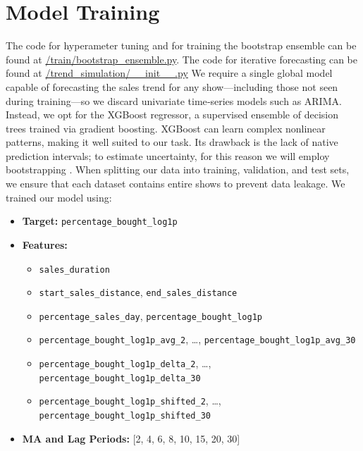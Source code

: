 \documentclass{Configuration_Files/PoliMi3i_thesis}
\begin{document}
\chapter{Model Training}
The code for hyperameter tuning and for training the bootstrap ensemble can be found at \href{https://github.com/SiniscalchiCarlo/piccolo_teatro/blob/develop/piccolo_teatro/train/bootstrap\_ensemble.py}{/train/bootstrap\_ensemble.py}.
The code for iterative forecasting can be found at \href{https://github.com/SiniscalchiCarlo/piccolo_teatro/blob/develop/piccolo_teatro/trend_simulation/__init__.py}{/trend\_simulation/\_\_init\_\_.py}
We require a single global model capable of forecasting the sales trend for any show—including those not seen during training—so we discard univariate time‐series models such as ARIMA.  Instead, we opt for the XGBoost regressor, a supervised ensemble of decision trees trained via gradient boosting.  XGBoost \cite{chen2016xgboost} can learn complex nonlinear patterns, making it well suited to our task.  Its drawback is the lack of native prediction intervals; to estimate uncertainty, for this reason we will employ bootstrapping \cite{efron1979boot}.
When splitting our data into training, validation, and test sets, we ensure that each dataset contains entire shows to prevent data leakage.
We trained our model using:
\begin{itemize}
  \item \textbf{Target:} \texttt{percentage\_bought\_log1p}
  \item \textbf{Features:}
    \begin{itemize}
      \item \texttt{sales\_duration}

      \item \texttt{start\_sales\_distance}, \texttt{end\_sales\_distance} 
    \item \texttt{percentage\_sales\_day}, \texttt{percentage\_bought\_log1p}
      \item \texttt{percentage\_bought\_log1p\_avg\_2}, \ldots, \texttt{percentage\_bought\_log1p\_avg\_30}
      \item \texttt{percentage\_bought\_log1p\_delta\_2}, \ldots, \texttt{percentage\_bought\_log1p\_delta\_30}
      \item \texttt{percentage\_bought\_log1p\_shifted\_2}, \ldots, \texttt{percentage\_bought\_log1p\_shifted\_30}
    \end{itemize}
  \item \textbf{MA and Lag Periods:} [2, 4, 6, 8, 10, 15, 20, 30]
\end{itemize}
\end{document}
